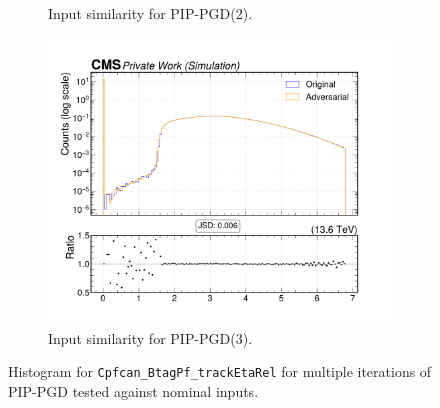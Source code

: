 \begin{figure}[htbp]
\begin{subfigure}[t]{0.32\textwidth}
    \caption*{Input similarity for PIP-PGD(2).}
  \end{subfigure}\hfill
  \begin{subfigure}[t]{0.32\textwidth}
    \includegraphics[width=\linewidth]{media/output/features/compare/combined_it_3/cmp_cpf_arr_Cpfcan_BtagPf_trackEtaRel.pdf}
    \caption*{Input similarity for PIP-PGD(3).}
  \end{subfigure}

  \caption*{Histogram for \texttt{Cpfcan\_BtagPf\_trackEtaRel} for multiple iterations of PIP-PGD tested against nominal inputs.}
  \label{fig:combined_input_Cpfcan_BtagPf_trackEtaRel}
\end{figure}

